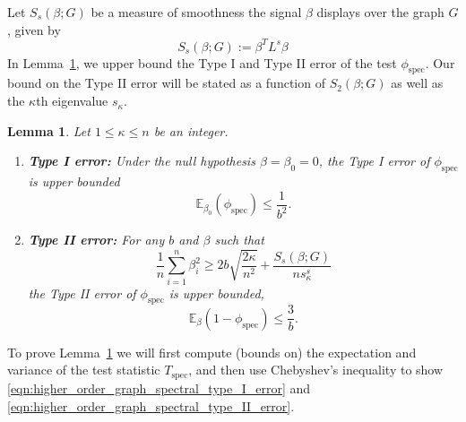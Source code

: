 \documentclass{article}
\newcommand{\1}{\mathbf{1}}
\newcommand{\spec}{\mathrm{spec}}
\theoremstyle{alden}
\theoremstyle{aldenthm}
\newtheorem{lemma}{Lemma}
\theoremstyle{definition}
\theoremstyle{remark}
\begin{document}
Let $S_s(\beta;G)$ be a measure of smoothness the signal $\beta$ displays over the graph $G$, given by
\begin{equation*}
S_s(\beta;G) := \beta^T L^s \beta
\end{equation*}
In Lemma~\ref{lem:higher_order_fixed_graph_testing}, we upper bound the Type I and Type II error of the test $\phi_{\spec}$. Our bound on the Type II error will be stated as a function of $S_2(\beta;G)$ as well as the $\kappa$th eigenvalue $s_{\kappa}$.

\begin{lemma}
	\label{lem:higher_order_fixed_graph_testing}
	Let $1 \leq \kappa \leq n$ be an integer.
	\begin{enumerate}
		\item \textbf{Type I error:} Under the null hypothesis $\beta = \beta_0 = 0$, the Type I error of $\phi_{\spec}$ is upper bounded
		\begin{equation}
		\label{eqn:higher_order_graph_spectral_type_I_error}
		\mathbb{E}_{\beta_0}(\phi_{\spec}) \leq \frac{1}{b^2}.
		\end{equation}
		\item \textbf{Type II error:} For any $b$ and $\beta$ such that
		\begin{equation}
		\label{eqn:higher_order_fixed_graph_testing_critical_radius}
		\frac{1}{n} \sum_{i = 1}^{n} \beta_i^2 \geq 2b\sqrt{\frac{2\kappa}{n^2}} + \frac{S_s(\beta;G)}{ns_{\kappa}^s}
		\end{equation}
		the Type II error of $\phi_{\spec}$ is upper bounded,
		\begin{equation}
		\label{eqn:higher_order_graph_spectral_type_II_error}
		\mathbb{E}_{\beta}(1 - \phi_{\spec}) \leq \frac{3}{b}.
		\end{equation}
	\end{enumerate}
\end{lemma}

To prove Lemma~\ref{lem:higher_order_fixed_graph_testing} we will first compute (bounds on) the expectation and variance of the test statistic $T_{\mathrm{spec}}$, and then use Chebyshev's inequality to show \eqref{eqn:higher_order_graph_spectral_type_I_error} and \eqref{eqn:higher_order_graph_spectral_type_II_error}.

\vspace{.2 in}
\end{document}
